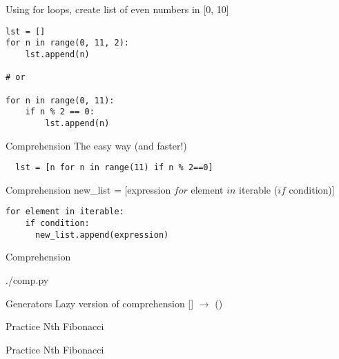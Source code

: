 \documentclass{beamer}
\begin{document}
\begin{frame}[fragile]
  Using for loops, create list of even numbers in [0, 10]
  \begin{lstlisting}
lst = []
for n in range(0, 11, 2):
    lst.append(n)

# or

for n in range(0, 11):
    if n % 2 == 0:
        lst.append(n)
  \end{lstlisting}
\end{frame}

\begin{frame}[fragile]{Comprehension}
  The easy way (and faster!)
  \begin{lstlisting}
  lst = [n for n in range(11) if n % 2==0]
  \end{lstlisting}
\end{frame}

\begin{frame}[fragile]{Comprehension}
  new\_list = [expression $for$ element $in$ iterable ($if$ condition)]\\
  \begin{lstlisting}
for element in iterable:
    if condition:
      new_list.append(expression)
  \end{lstlisting}
\end{frame}

\begin{frame}[fragile]{Comprehension}
  \begin{lstinputlisting}
    {./comp.py}
  \end{lstinputlisting}
\end{frame}

\begin{frame}[fragile]{Generators}
  Lazy version of comprehension [] $\rightarrow$ ()
\end{frame}

\begin{frame}{Practice}
  Nth Fibonacci
\end{frame}

\begin{frame}{Practice}
  Nth Fibonacci
\end{frame}
\end{document}
